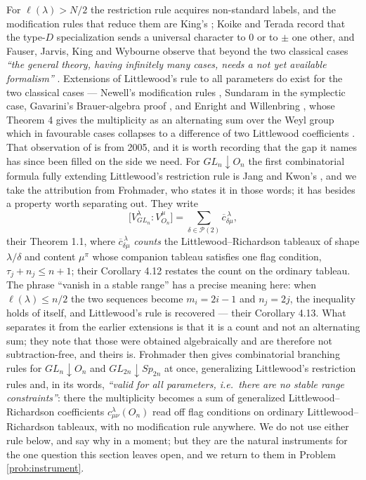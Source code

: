 \documentclass[11pt,reqno]{amsart}
\theoremstyle{plain}
\theoremstyle{definition}
\begin{document}
For $\ell(\lambda)>N/2$ the restriction rule acquires non-standard labels, and the modification rules
that reduce them are King's \cite{King71}; Koike and Terada \cite{KT87} record that the
type-$D$ specialization sends a universal character to $0$ or to $\pm$ one other, and Fauser, Jarvis,
King and Wybourne observe that beyond the two classical cases \emph{``the general theory, having
infinitely many cases, needs a not yet available formalism''} \cite[\S4]{FJKW05}. Extensions of Littlewood's rule to all parameters do exist for the two classical
cases --- Newell's modification rules \cite{New51}, Sundaram \cite{Sun90} in the symplectic case,
Gavarini's Brauer-algebra proof \cite{Gav99}, and Enright and Willenbring \cite{EW04}, whose Theorem 4
gives the multiplicity as an alternating sum over the Weyl group which in favourable cases collapses
to a difference of two Littlewood coefficients \cite[\S7.11]{EW04}. That observation of
\cite{FJKW05} is from 2005, and it is worth recording that the gap it names has since been filled on
the side we need. For $GL_n\downarrow O_n$ the first combinatorial formula fully
extending Littlewood's restriction rule is Jang and Kwon's \cite{JK20}, and we take the attribution
from Frohmader, who states it in those words; it has besides a property worth separating out. They
write
\[
\bigl[V^{\lambda}_{GL_n}:V^{\mu}_{O_n}\bigr]
=\sum_{\delta\in\mathcal P(2)}\overline{c}^{\,\lambda}_{\delta\mu},
\]
their Theorem 1.1, where $\overline{c}^{\,\lambda}_{\delta\mu}$ \emph{counts} the
Littlewood--Richardson tableaux of shape $\lambda/\delta$ and content $\mu^{\pi}$ whose companion
tableau satisfies one flag condition, $\tau_j+n_j\le n+1$; their Corollary 4.12 restates the count
on the ordinary tableau. The phrase ``vanish in a stable range'' has a precise meaning here:
when $\ell(\lambda)\le n/2$ the two sequences become $m_i=2i-1$ and $n_j=2j$, the inequality holds
of itself, and Littlewood's rule is recovered --- their Corollary 4.13. What separates it from the
earlier extensions is that it is a count and not an alternating sum; they note that those were
obtained algebraically and are therefore not subtraction-free, and theirs is. Frohmader
\cite{Frohmader} then gives combinatorial branching rules for $GL_n\downarrow O_n$ and
$GL_{2n}\downarrow Sp_{2n}$ at once, generalizing Littlewood's restriction rules and, in its words,
\emph{``valid for all parameters, i.e.\ there are no stable range constraints''}: there the
multiplicity becomes a sum of generalized Littlewood--Richardson coefficients
$c^{\lambda}_{\mu\nu}(O_n)$ read off flag conditions on ordinary Littlewood--Richardson tableaux,
with no modification rule anywhere. We do not use
either rule below, and say why in a moment; but they are the natural instruments for the one
question this section leaves open, and we return to them in Problem \ref{prob:instrument}.
\end{document}

